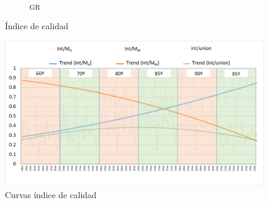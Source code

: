 \begin{figure}[h!]
\begin{subfigure}[b]{0.8\textwidth}
         \caption{\textpsi \textsubscript{GR}}
         \label{psiGR}
     \end{subfigure}
        \caption{Índice de calidad}
        \label{quality_index}
\end{figure}

\begin{figure} [h!]
         \centering
         \includegraphics[width=\textwidth]{Imagenes/grafico.png}
         \hfill
         \caption{Curvas índice de calidad}
        \label{curvas_QI}
\end{figure}

